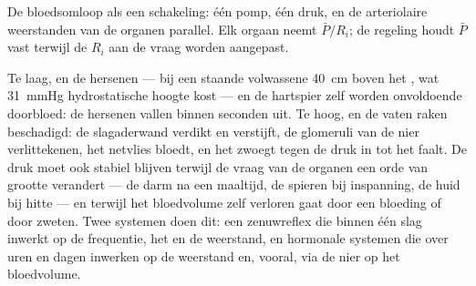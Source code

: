 \begin{omfigure}

{\small De bloedsomloop als een schakeling: één pomp, één druk, en de
arteriolaire weerstanden van de organen parallel. Elk orgaan neemt
$\bar P/R_i$; de regeling houdt $\bar P$ vast terwijl de $R_i$ aan de vraag
worden aangepast.}
\end{omfigure}

\begin{proposition}\label{prop:b2:blood-pressure:why}
Te laag, en de hersenen --- bij een staande volwassene \qty{40}{cm} boven het
, wat \qty{31}{mmHg} hydrostatische hoogte kost --- en de hartspier zelf
worden onvoldoende doorbloed: de hersenen vallen binnen seconden uit. Te
hoog, en de vaten raken beschadigd: de slagaderwand verdikt en verstijft, de
glomeruli van de nier verlittekenen, het netvlies bloedt, en het  zwoegt
tegen de druk in tot het faalt. De druk moet ook stabiel blijven terwijl de
vraag van de organen een orde van grootte verandert --- de darm na een
maaltijd, de spieren bij inspanning, de huid bij hitte --- en terwijl het
bloedvolume zelf verloren gaat door een bloeding of door zweten. Twee
systemen doen dit: een zenuwreflex die binnen één slag inwerkt op de
frequentie, het  en de weerstand, en hormonale systemen die over
uren en dagen inwerken op de weerstand en, vooral, via de nier op het
bloedvolume.
\end{proposition}

